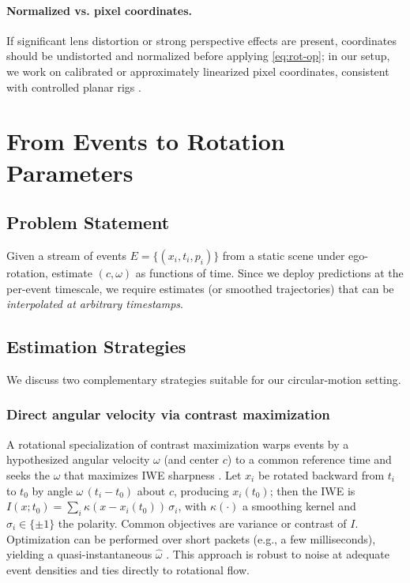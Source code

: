 \paragraph{Normalized vs. pixel coordinates.}
If significant lens distortion or strong perspective effects are present, coordinates should be undistorted and normalized before applying \eqref{eq:rot-op}; in our setup, we work on calibrated or approximately linearized pixel coordinates, consistent with controlled planar rigs \cite{Scheerlinck2021Thesis,Wang2025Thesis}.

\section{From Events to Rotation Parameters}
\subsection{Problem Statement}
Given a stream of events $E=\{(x_i,t_i,p_i)\}$ from a static scene under ego-rotation, estimate $(c,\omega)$ as functions of time. Since we deploy predictions at the per-event timescale, we require estimates (or smoothed trajectories) that can be \emph{interpolated at arbitrary timestamps}.

\subsection{Estimation Strategies}
We discuss two complementary strategies suitable for our circular-motion setting.

\subsubsection{Direct angular velocity via contrast maximization}
A rotational specialization of contrast maximization warps events by a hypothesized angular velocity $\omega$ (and center $c$) to a common reference time and seeks the $\omega$ that maximizes IWE sharpness \cite{Gallego2017Angular,Gallego2018CMax}. Let $x_i$ be rotated backward from $t_i$ to $t_0$ by angle $\omega\,(t_i-t_0)$ about $c$, producing $x_i(t_0)$; then the IWE is $I(x;t_0) = \sum_i \kappa(x - x_i(t_0))\,\sigma_i$, with $\kappa(\cdot)$ a smoothing kernel and $\sigma_i\in\{\pm 1\}$ the polarity. Common objectives are variance or contrast of $I$. Optimization can be performed over short packets (e.g., a few milliseconds), yielding a quasi-instantaneous $\hat\omega$ \cite{Gallego2018CMax}. This approach is robust to noise at adequate event densities and ties directly to rotational flow.

